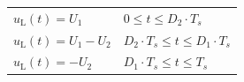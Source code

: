 
\begin{solutiontable}[ht]
	\centering  %
	\begin{tabular}{ll}
		\toprule
		$u_\mathrm{L}(t) = U_\mathrm{1}$              & $0\leq t \leq D_2 \cdot T_s$               \\
		$u_\mathrm{L}(t) = U_\mathrm{1}-U_\mathrm{2}$ & $D_2 \cdot T_s \leq t  \leq D_1 \cdot T_s$ \\
		$u_\mathrm{L}(t) = -U_\mathrm{2}$             & $D_1 \cdot T_s \leq t \leq T_s$            \\
		\bottomrule
	\end{tabular}
	\caption{$u_\mathrm{L}(t)$ during the switching period.}
	\label{table:VoltageAtInductorInCase1_2}
\end{solutiontable}